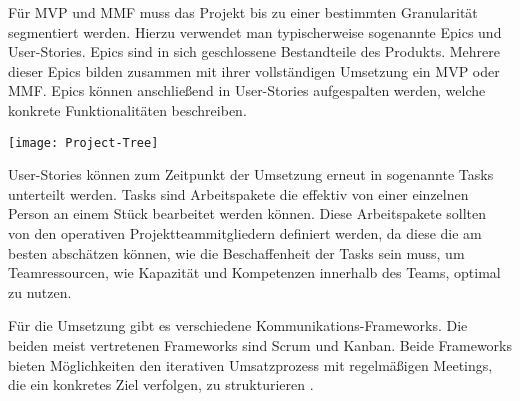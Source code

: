 Für MVP und MMF muss das Projekt bis zu einer bestimmten Granularität segmentiert werden. Hierzu verwendet man typischerweise sogenannte Epics und User-Stories. Epics sind in sich geschlossene Bestandteile des Produkts. Mehrere dieser Epics bilden zusammen mit ihrer vollständigen Umsetzung ein MVP oder MMF. Epics können anschließend in User-Stories aufgespalten werden, welche konkrete Funktionalitäten beschreiben. \cite{agilesProjektmanagementImBerufsalltagEpicsUndUserStories}

\vspace{20pt}
\begin{center}
    \begin{minipage}{0.8\linewidth}
        \texttt{[image: Project-Tree]}
    \end{minipage}
\end{center}
\vspace{20pt}

User-Stories können zum Zeitpunkt der Umsetzung erneut in sogenannte Tasks unterteilt werden. Tasks sind Arbeitspakete die effektiv von einer einzelnen Person an einem Stück bearbeitet werden können. Diese Arbeitspakete sollten von den operativen Projektteammitgliedern definiert werden, da diese die am besten abschätzen können, wie die Beschaffenheit der Tasks sein muss, um Teamressourcen, wie Kapazität und Kompetenzen innerhalb des Teams, optimal zu nutzen. \cite{agilesProjektmanagementImBerufsalltagEpicsUndUserStories}

Für die Umsetzung gibt es verschiedene Kommunikations-Frameworks. Die beiden meist vertretenen Frameworks sind Scrum und Kanban. Beide Frameworks bieten Möglichkeiten den iterativen Umsatzprozess mit regelmäßigen Meetings, die ein konkretes Ziel verfolgen, zu strukturieren \cite{}.

